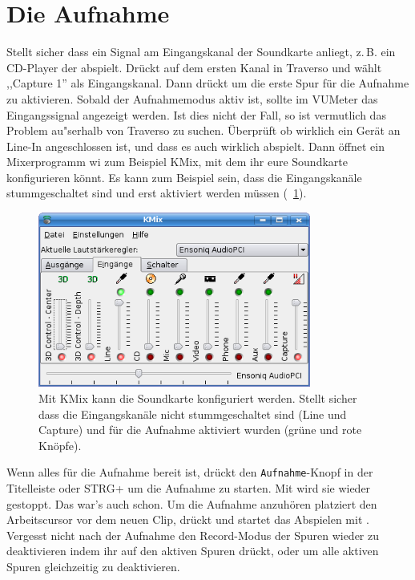 \section{Die Aufnahme}
Stellt sicher dass ein Signal am Eingangskanal der Soundkarte anliegt, z.\,B. ein CD-Player der abspielt. Drückt  auf dem ersten Kanal in Traverso und wählt ,,Capture 1'' als Eingangskanal. Dann drückt  um die erste Spur für die Aufnahme zu aktivieren. Sobald der Aufnahmemodus aktiv ist, sollte im VUMeter das Eingangssignal angezeigt werden. Ist dies nicht der Fall, so ist vermutlich das Problem au"serhalb von Traverso zu suchen. Überprüft ob wirklich ein Gerät an Line-In angeschlossen ist, und dass es auch wirklich abspielt. Dann öffnet ein Mixerprogramm wi zum Beispiel KMix, mit dem ihr eure Soundkarte konfigurieren könnt. Es kann zum Beispiel sein, dass die Eingangskanäle stummgeschaltet sind und erst aktiviert werden müssen (\FigB\ \ref{fig_kmix01}).

\begin{figure}
 \centering\includegraphics[width=0.8\textwidth]{../images/kmix01.png}
 \caption{Mit KMix kann die Soundkarte konfiguriert werden. Stellt sicher dass die Eingangskanäle nicht stummgeschaltet sind (Line und Capture) und für die Aufnahme aktiviert wurden (grüne und rote Knöpfe).}
 \label{fig_kmix01}
\end{figure}

Wenn alles für die Aufnahme bereit ist, drückt den \texttt{Aufnahme}-Knopf in der Titelleiste oder STRG+ um die Aufnahme zu starten. Mit  wird sie wieder gestoppt. Das war's auch schon. Um die Aufnahme anzuhören platziert den Arbeitscursor vor dem neuen Clip, drückt  und startet das Abspielen mit . Vergesst nicht nach der Aufnahme den Record-Modus der Spuren wieder zu deaktivieren indem ihr  auf den aktiven Spuren drückt, oder  um alle aktiven Spuren gleichzeitig zu deaktivieren.
